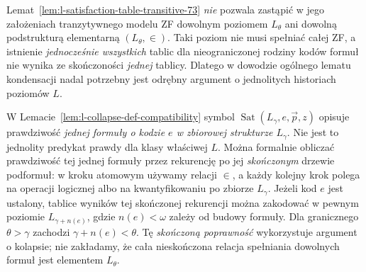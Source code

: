 \begin{uwaga}
\label{rem:l-table-vs-stage-73}
Lemat~\ref{lem:l-satisfaction-table-transitive-73}
\emph{nie} pozwala zastąpić w jego założeniach
tranzytywnego modelu ZF dowolnym poziomem $L_\theta$
ani dowolną podstrukturą elementarną $(L_\theta,\in)$.
Taki poziom nie musi spełniać całej ZF, a istnienie
\emph{jednocześnie wszystkich} tablic dla nieograniczonej
rodziny kodów formuł nie wynika ze skończoności
\emph{jednej} tablicy. Dlatego w dowodzie ogólnego
lematu kondensacji nadal potrzebny jest odrębny
argument o jednolitych historiach poziomów $L$.
\end{uwaga}

\begin{uwaga}
\label{rem:l-finite-satisfaction-in-limit}
W Lemacie~\ref{lem:l-collapse-def-compatibility} symbol
$\operatorname{Sat}(L_\gamma,e,\vec p,z)$ opisuje
prawdziwość \emph{jednej formuły o kodzie $e$ w
zbiorowej strukturze $L_\gamma$}. Nie jest to
jednolity predykat prawdy dla klasy właściwej $L$.
Można formalnie obliczać prawdziwość tej jednej formuły
przez rekurencję po jej \emph{skończonym} drzewie
podformuł: w kroku atomowym używamy relacji $\in$,
a każdy kolejny krok polega na operacji logicznej
albo na kwantyfikowaniu po zbiorze $L_\gamma$.
Jeżeli kod $e$ jest ustalony, tablice wyników tej
skończonej rekurencji można zakodować w pewnym poziomie
$L_{\gamma+n(e)}$, gdzie $n(e)<\omega$ zależy od
budowy formuły. Dla granicznego $\theta>\gamma$
zachodzi $\gamma+n(e)<\theta$.
Tę \emph{skończoną poprawność} wykorzystuje argument
o kolapsie; nie zakładamy, że cała nieskończona
relacja spełniania dowolnych formuł jest elementem
$L_\theta$.
\end{uwaga}



